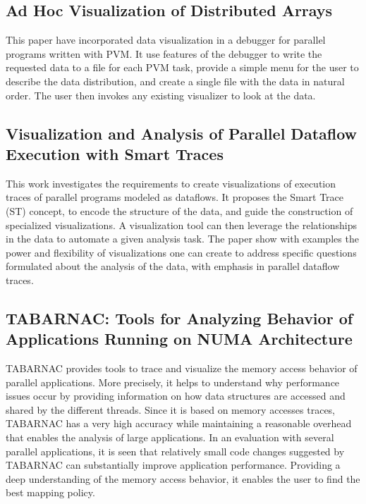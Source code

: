 \subsection{Ad Hoc Visualization of Distributed Arrays}
This paper have incorporated data visualization in a debugger for parallel programs written with PVM. It use features of the debugger to write the requested data to a file for each PVM task, provide a simple menu for the user to describe the data distribution, and create a single file with the data in natural order. The user then invokes any existing visualizer to look at the data.

\subsection{Visualization and Analysis of Parallel Dataflow Execution with Smart Traces}
This work investigates the requirements to create visualizations of execution traces of parallel programs modeled as dataflows. It proposes the Smart Trace (ST) concept, to encode the structure of the data, and guide the construction of specialized visualizations. A visualization tool can then leverage the relationships in the data to automate a given analysis task. The paper show with examples the power and flexibility of visualizations one can create to address specific questions formulated about the analysis of the data, with emphasis in parallel dataflow traces.

\subsection{TABARNAC: Tools for Analyzing Behavior of Applications Running on NUMA Architecture}
TABARNAC provides tools to trace and visualize the memory access behavior of parallel applications. More precisely, it helps to understand why performance issues occur by providing information on how data structures are accessed and shared by the different threads. Since it is based on memory accesses traces, TABARNAC has a very high accuracy while maintaining a reasonable overhead that enables the analysis of large applications. In an evaluation with several parallel applications, it is seen that relatively small code changes suggested by TABARNAC can substantially improve application performance. Providing a deep understanding of the memory access behavior, it enables the user to find the best mapping policy.
